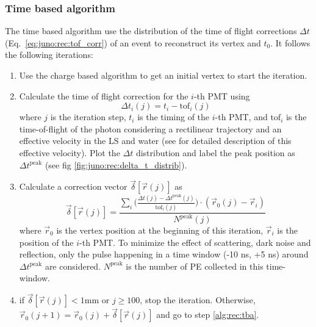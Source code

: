 \documentclass[../main.tex]{subfiles}
\begin{document}
\subsubsection{Time based algorithm}

The time based algorithm use the distribution of the time of flight corrections $\Delta t$ (Eq.\ \ref{eq:juno:rec:tof_corr}) of an event to reconstruct its vertex and $t_0$. It follows the following iterations:

\begin{enumerate}
  \item Use the charge based algorithm to get an initial vertex to start the iteration.

  \item \label{alg:rec:tba} Calculate the time of flight correction for the $i$-th PMT using \begin{equation}
      \label{eq:juno:rec:tof_corr}
      \Delta t_i (j) = t_i - \mathrm{tof}_i (j)
    \end{equation}
    where $j$ is the iteration step, $t_i$ is the timing of the $i$-th PMT, and $\mathrm{tof}_i$ is the time-of-flight of the photon considering a rectilinear trajectory and an effective velocity in the LS and water (see \cite{li_event_2021} for detailed description of this effective velocity). Plot the $\Delta t$ distribution and label the peak position as $\Delta t^{\mathrm{peak}}$ (see fig \ref{fig:juno:rec:delta_t_distrib}).

  \item Calculate a correction vector $\vec{\delta} [\vec{r}(j)]$ as \begin{equation}
      \vec{\delta} [\vec{r}(j)] = \frac{\sum_i \bigg(\frac{\Delta t(j) - \Delta t^{\mathrm{peak}}(j)}{\mathrm{tof}_i(j)} \bigg) \cdot (\vec{r}_0(j) - \vec{r}_i)}{N^{\mathrm{peak}}(j)}
    \end{equation}
    where $\vec{r}_0$ is the vertex position at the beginning of this iteration, $\vec{r}_i$ is the position of the $i$-th PMT. To minimize the effect of scattering, dark noise and reflection, only the pulse happening in a time window (-10 ns, +5 ns) around $\Delta t^{\mathrm{peak}}$ are considered. $N^{\mathrm{peak}}$ is the number of PE collected in this time-window.

  \item if $\vec{\delta} [\vec{r}(j)] < 1 \mathrm{mm}$ or $j \geq 100$, stop the iteration. Otherwise, $\vec{r}_0 (j + 1) = \vec{r}_0 (j) + \vec{\delta} [\vec{r}(j)]$ and go to step \ref{alg:rec:tba}.
\end{enumerate}
\end{document}
